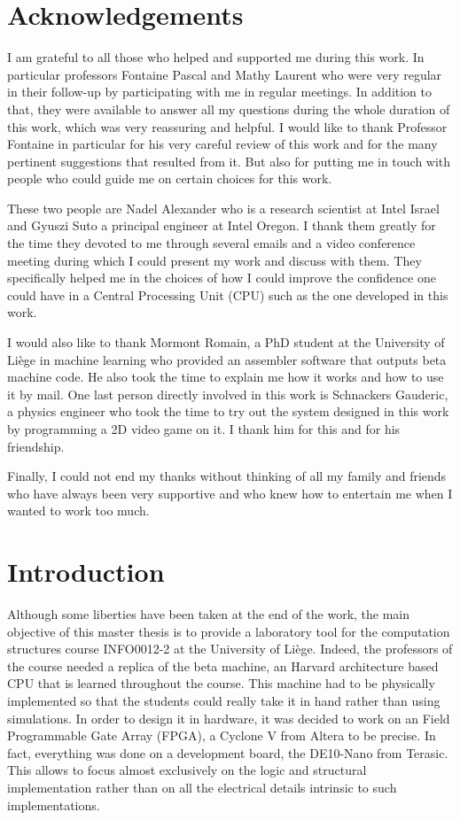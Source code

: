 \chapter*{Acknowledgements}

I am grateful to all those who helped and supported me during this work. In particular professors 
Fontaine Pascal and Mathy Laurent who were very regular in their follow-up by participating with me 
in regular meetings. In addition to that, they were available to answer all my questions during the 
whole duration of this work, which was very reassuring and helpful. I would like to thank Professor 
Fontaine in particular for his very careful review of this work and for the many pertinent 
suggestions that resulted from it. But also for putting me in touch with people who could guide me 
on certain choices for this work.

These two people are Nadel Alexander who is a research scientist at Intel Israel and Gyuszi 
Suto a principal engineer at Intel Oregon. I thank them greatly for the time they devoted to me through 
several emails and a video conference meeting during which I could present my work and discuss with 
them. They specifically helped me in the choices of how I could 
improve the confidence one could have in a Central Processing Unit (CPU) such as the one developed in this work.

I would also like to thank Mormont Romain, a PhD student at the University of Liège in machine learning
who provided an assembler software that outputs beta machine code. He also took 
the time to explain me how it works and how to use it by mail. One last person directly involved in 
this work is Schnackers Gauderic, a physics engineer who took the time to try out the system 
designed in this work by programming a 2D video game on it. I thank him for this and for his friendship.

Finally, I could not end my thanks without thinking of all my family and friends who have always been 
very supportive and who knew how to entertain me when I wanted to work too much.

\chapter*{Introduction}

Although some liberties have been taken at the end of the work, the main objective of this master thesis
is to provide a laboratory tool for the computation structures course INFO0012-2 at the University of Liège. Indeed, the professors of 
the course needed a replica of the beta machine, an Harvard architecture based CPU that is learned
throughout the course. This machine had to be physically implemented so that the students could 
really take it in hand rather than using simulations. In order to design it in hardware, it was 
decided to work on an Field Programmable Gate Array (FPGA), a Cyclone V from Altera to be precise. In fact, everything was done on a 
development board, the DE10-Nano from Terasic. This allows to focus almost exclusively on the logic and 
structural implementation rather than on all the electrical details intrinsic to such 
implementations.

